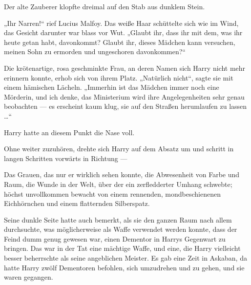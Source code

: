 Der alte Zauberer klopfte dreimal auf den Stab aus dunklem Stein.

„Ihr Narren!“ rief Lucius Malfoy.
Das weiße Haar schüttelte sich wie im Wind, das Gesicht darunter war blass vor Wut.
„Glaubt ihr, dass ihr mit dem, was ihr heute getan habt, davonkommt? Glaubt ihr, dieses Mädchen kann versuchen, meinen Sohn zu ermorden und ungeschoren davonkommen?“

Die krötenartige, rosa geschminkte Frau, an deren Namen sich Harry nicht mehr erinnern konnte, erhob sich von ihrem Platz.
„Natürlich nicht“, sagte sie mit einem hämischen Lächeln.
„Immerhin ist das Mädchen immer noch eine Mörderin, und ich denke, das Ministerium wird ihre Angelegenheiten sehr genau beobachten — es erscheint kaum klug, sie auf den Straßen herumlaufen zu lassen …“

Harry hatte an diesem Punkt die Nase voll.

Ohne weiter zuzuhören, drehte sich Harry auf dem Absatz um und schritt in langen Schritten vorwärts in Richtung —

Das Grauen, das nur er wirklich sehen konnte, die Abwesenheit von Farbe und Raum, die Wunde in der Welt, über der ein zerfledderter Umhang schwebte; höchst unvollkommen bewacht von einem rennenden, mondbeschienenen Eichhörnchen und einem flatternden Silberspatz.

Seine dunkle Seite hatte auch bemerkt, als sie den ganzen Raum nach allem durchsuchte, was möglicherweise als Waffe verwendet werden konnte, dass der Feind dumm genug gewesen war, einen Dementor in Harrys Gegenwart zu bringen. Das war in der Tat eine mächtige Waffe, und eine, die Harry vielleicht besser beherrschte als seine angeblichen Meister. Es gab eine Zeit in Askaban, da hatte Harry zwölf Dementoren befohlen, sich umzudrehen und zu gehen, und sie waren gegangen.

